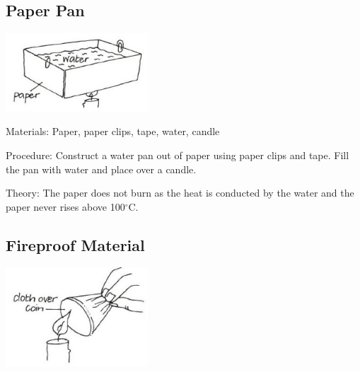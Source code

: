 \begin{multicols}{2}
\subsection{Paper Pan}

\begin{center}
\includegraphics[width=0.4\textwidth]{./img/vso/paper-pan.png}
\end{center}

\begin{description*}
\item[Materials:]{Paper, paper clips, tape, water, candle}
\item[Procedure:]{Construct a water pan out of paper using paper clips and tape. Fill the pan with water and place over a candle.}
\item[Theory:]{The paper does not burn as the heat is conducted by the water and the paper never rises above 100$^\circ$C.}
\end{description*}

\subsection{Fireproof Material}

\begin{center}
\includegraphics[width=0.4\textwidth]{./img/vso/fireproof.png}
\end{center}


\end{multicols}
